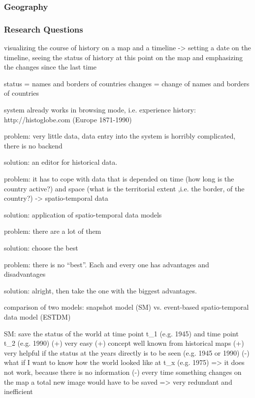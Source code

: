 

\subsubsection{Geography} %
\label{ssub:geography}



\subsubsection{Research Questions} %
\label{ssub:research_questions}





visualizing the course of history on a map and a timeline
-> setting a date on the timeline, seeing the status of history at this point on the map and emphasizing the changes since the last time

status = names and borders of countries
changes = change of names and borders of countries

system already works in browsing mode, i.e. experience history:
http://histoglobe.com
(Europe 1871-1990)

problem: very little data, data entry into the system is horribly complicated, there is no backend

solution: an editor for historical data.

problem: it has to cope with data that is depended on time (how long is the country active?) and space (what is the territorial extent ,i.e. the border, of the country?) -> spatio-temporal data

solution: application of spatio-temporal data models

problem: there are a lot of them

solution: choose the best

problem: there is no ``best''. Each and every one has advantages and disadvantages

solution: alright, then take the one with the biggest advantages.

comparison of two models: snapshot model (SM) vs. event-based spatio-temporal data model (ESTDM)

SM: save the status of the world at time point t\_1 (e.g. 1945) and time point t\_2 (e.g. 1990)
(+) very easy
(+) concept well known from historical maps
(+) very helpful if the status at the years directly is to be seen (e.g. 1945 or 1990)
(-) what if I want to know how the world looked like at t\_x (e.g. 1975)
=> it does not work, because there is no information
(-) every time something changes on the map a total new image would have to be saved
=> very redundant and inefficient

